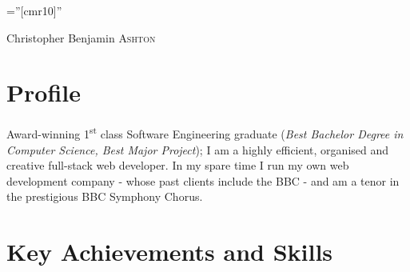 \documentclass[class=article, crop=false]{standalone}
\begin{document}
\pagestyle{empty} %

\font\fb=''[cmr10]'' %

\par{\centering
        {\Huge Christopher Benjamin \textsc{Ashton}
    }\bigskip\par}

\begin{center}
\customcontact
\end{center}


\section{Profile}

Award-winning 1\textsuperscript{st} class Software Engineering graduate (\emph{Best Bachelor Degree in Computer Science, Best Major Project}); I am a highly efficient, organised and creative full-stack web developer. In my spare time I run my own web development company - whose past clients include the BBC - and am a tenor in the prestigious BBC Symphony Chorus.

\section{Key Achievements and Skills}
\end{document}
